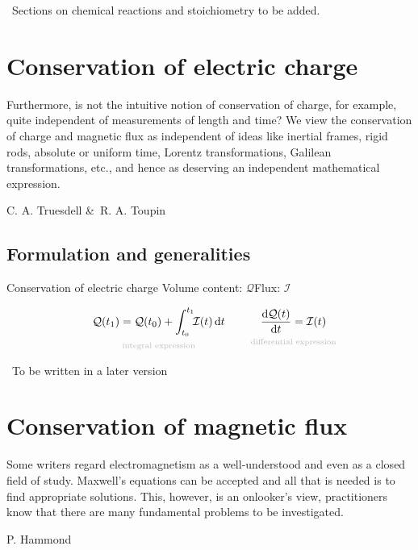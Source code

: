 \documentclass[a4paper,12pt,%
onecolumn,oneside,%
british%
]{memoir}
\newcommand*{\amp}{\&}
\newcommand{\mynotew}[1]{{\footnotesize\color{midgrey}\faIcon{tools}\ #1}}
\newcommand*{\di}{\mathop{}\!\mathrm{d}}%
\renewcommand*{\|}[1][]{\nonscript\:#1\vert\nonscript\:\mathopen{}}
\newcommand*{\yti}{t_{0}}
\newcommand*{\ytf}{t_{1}}
\newcommand*{\dt}{\di t}
\newcommand*{\yC}{\mathcal{Q}}
\newcommand*{\yI}{\mathcal{I}}
\begin{document}
\bigskip
\mynotew{Sections on chemical reactions and stoichiometry to be added.}

\printpagenotes*
\cleartooddpage
\chapter{Conservation of electric charge}
\label{cha:cons_charge}

\epigraph{Furthermore, is not the intuitive notion of conservation of charge, for example, quite independent of measurements of length and time? We view the conservation of charge and magnetic flux as independent of ideas like inertial frames, rigid rods, absolute or uniform time, Lorentz transformations, Galilean transformations, etc., and hence as deserving an independent mathematical expression.}{C. A. Truesdell \amp\ R. A. Toupin \cites*{truesdelletal1960}}

\section{Formulation and generalities}
\label{sec:cons_charge_formulation}

\begin{definition}{Conservation of electric charge}
  Volume content: $\yC$\qquad Flux: $\yI$

  \begin{equation}
    \label{eq:cons_charge}
    \underbracket[0pt]{\yC(\ytf) =
      \yC(\yti) +
      \int_{\yti}^{\ytf}\!\!\yI(t)\dt}_{\mathclap{\text{\color{grey}integral expression}}}
      \qquad\quad
      \underbracket[0pt]{\frac{\di\yC(t)}{\dt} =
        \yI(t)}_{\mathclap{\text{\color{grey}differential expression}}}
  \end{equation}
\end{definition}


\mynotew{To be written in a later version}


\printpagenotes*
\cleartooddpage
\chapter{Conservation of magnetic flux}
\label{cha:cons_magneticflux}

\epigraph{Some writers regard electromagnetism as a well-understood and even as a closed field of study. Maxwell's equations can be accepted and all that is needed is to find appropriate solutions. This, however, is an onlooker's view, practitioners know that there are many fundamental problems to be investigated.}{P. Hammond \cites*{hammond1988}}
\end{document}
